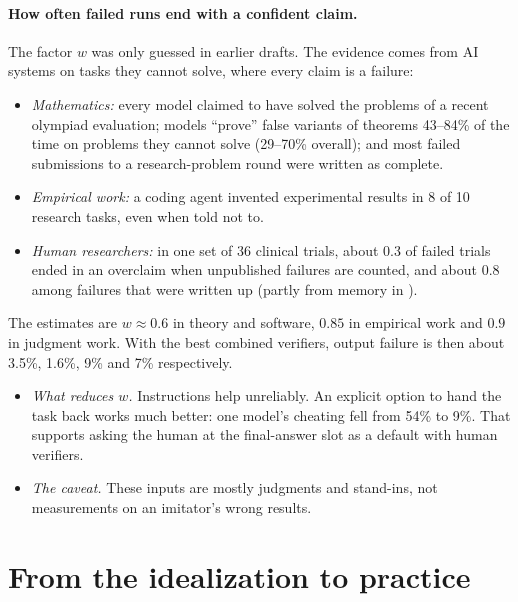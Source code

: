 \documentclass[11pt]{article}
\theoremstyle{definition}
\theoremstyle{remark}
\begin{document}
\paragraph{How often failed runs end with a confident claim.} The factor $w$ was only guessed in earlier drafts. The evidence \cite{threadW} comes from AI systems on tasks they cannot solve, where every claim is a failure:
\begin{itemize}[nosep]
\item \emph{Mathematics:} every model claimed to have solved the problems of a recent olympiad evaluation; models ``prove'' false variants of theorems 43--84\% of the time on problems they cannot solve (29--70\% overall); and most failed submissions to a research-problem round were written as complete.
\item \emph{Empirical work:} a coding agent invented experimental results in 8 of 10 research tasks, even when told not to.
\item \emph{Human researchers:} in one set of 36 clinical trials, about 0.3 of failed trials ended in an overclaim when unpublished failures are counted, and about 0.8 among failures that were written up (partly from memory in \cite{threadW}).
\end{itemize}
The estimates are $w\approx0.6$ in theory and software, $0.85$ in empirical work and $0.9$ in judgment work. With the best combined verifiers, output failure is then about 3.5\%, 1.6\%, 9\% and 7\% respectively.
\begin{itemize}[nosep]
\item \emph{What reduces $w$.} Instructions help unreliably. An explicit option to hand the task back works much better: one model's cheating fell from 54\% to 9\%. That supports asking the human at the final-answer slot as a default with human verifiers.
\item \emph{The caveat.} These inputs are mostly judgments and stand-ins, not measurements on an imitator's wrong results.
\end{itemize}

\section{From the idealization to practice}\label{sec:practice}
\end{document}
